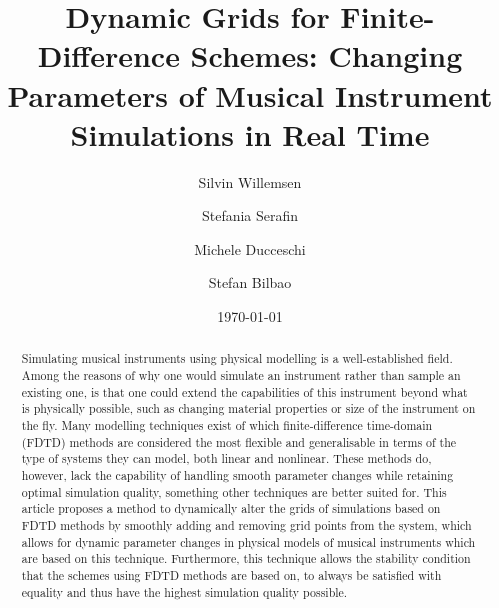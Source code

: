 \documentclass[dvipsnames, preprint]{JASA}
\begin{document}
\title[JASA/Dynamic Grids for Finite-Difference Schemes]{Dynamic Grids for Finite-Difference Schemes: Changing Parameters of Musical Instrument Simulations in Real Time}
\author{Silvin Willemsen}
\author{Stefania Serafin}

\author{Michele Ducceschi}
\author{Stefan Bilbao}
 



\date{\today} 

\begin{abstract}
Simulating musical instruments using physical modelling is a well-established field. Among the reasons of why one would simulate an instrument rather than sample an existing one, is that one could extend the capabilities of this instrument beyond what is physically possible, such as changing material properties or size of the instrument on the fly. Many modelling techniques exist of which finite-difference time-domain (FDTD) methods are considered the most flexible and generalisable in terms of the type of systems they can model, both linear and nonlinear. These methods do, however, lack the capability of handling smooth parameter changes while retaining optimal simulation quality, something other techniques are better suited for. This article proposes a method to dynamically alter the grids of simulations based on FDTD methods by smoothly adding and removing grid points from the system, which allows for dynamic parameter changes in physical models of musical instruments which are based on this technique. Furthermore, this technique allows the stability condition that the schemes using FDTD methods are based on, to always be satisfied with equality and thus have the highest simulation quality possible. 
\end{abstract}


\maketitle
\end{document}
